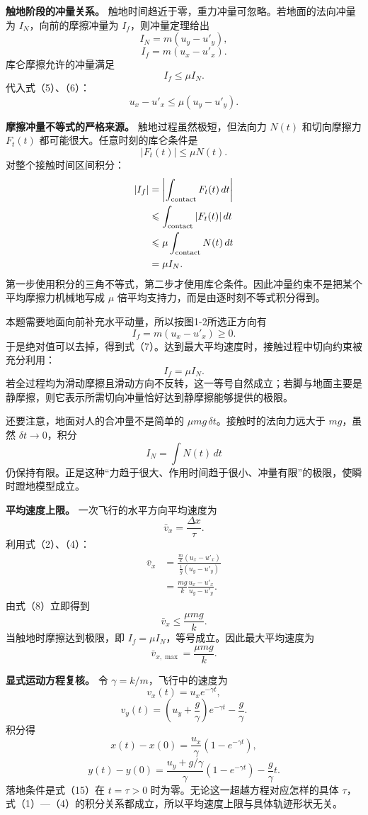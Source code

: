 \documentclass[12pt,a4paper,UTF8]{ctexart}
\begin{document}
\textbf{触地阶段的冲量关系。}
触地时间趋近于零，重力冲量可忽略。若地面的法向冲量为
\(I_N\)，向前的摩擦冲量为 \(I_f\)，则冲量定理给出 \[
I_N=m(u_y-u'_y), \tag{5}
\] \[
I_f=m(u_x-u'_x). \tag{6}
\] 库仑摩擦允许的冲量满足 \[
I_f\leq\mu I_N. \tag{7}
\] 代入式（5）、（6）： \[
u_x-u'_x\leq\mu(u_y-u'_y). \tag{8}
\]

\textbf{摩擦冲量不等式的严格来源。} 触地过程虽然极短，但法向力 \(N(t)\)
和切向摩擦力 \(F_t(t)\) 都可能很大。任意时刻的库仑条件是 \[
|F_t(t)|\leqslant\mu N(t).
\] 对整个接触时间区间积分： \[
\begin{aligned}
|I_f|
&=\left|
\int_{\rm contact}F_t(t)\,dt
\right|\\
&\leqslant
\int_{\rm contact}|F_t(t)|\,dt\\
&\leqslant
\mu\int_{\rm contact}N(t)\,dt\\
&=\mu I_N.
\end{aligned}
\]
第一步使用积分的三角不等式，第二步才使用库仑条件。因此冲量约束不是把某个平均摩擦力机械地写成
\(\mu\) 倍平均支持力，而是由逐时刻不等式积分得到。

本题需要地面向前补充水平动量，所以按图1-2所选正方向有 \[
I_f=m(u_x-u'_x)\geqslant0.
\]
于是绝对值可以去掉，得到式（7）。达到最大平均速度时，接触过程中切向约束被充分利用：
\[
I_f=\mu I_N.
\]
若全过程均为滑动摩擦且滑动方向不反转，这一等号自然成立；若脚与地面主要是静摩擦，则它表示所需切向冲量恰好达到静摩擦能够提供的极限。

还要注意，地面对人的合冲量不是简单的
\(\mu mg\,\delta t\)。接触时的法向力远大于 \(mg\)，虽然
\(\delta t\to0\)，积分 \[
I_N=\int N(t)\,dt
\]
仍保持有限。正是这种``力趋于很大、作用时间趋于很小、冲量有限''的极限，使瞬时蹬地模型成立。

\textbf{平均速度上限。} 一次飞行的水平方向平均速度为 \[
\bar v_x=\frac{\Delta x}{\tau}.
\] 利用式（2）、（4）： \[
\begin{aligned}
\bar v_x
&=\frac{\frac{m}{k}(u_x-u'_x)}
{\frac1g(u_y-u'_y)}\\
&=\frac{mg}{k}
\frac{u_x-u'_x}{u_y-u'_y}.
\end{aligned} \tag{9}
\] 由式（8）立即得到 \[
\boxed{\bar v_x\leq\frac{\mu mg}{k}}. \tag{10}
\] 当触地时摩擦达到极限，即
\(I_f=\mu I_N\)，等号成立。因此最大平均速度为 \[
\boxed{\bar v_{x,\max}=\frac{\mu mg}{k}}. \tag{11}
\]

\textbf{显式运动方程复核。} 令 \(\gamma=k/m\)，飞行中的速度为 \[
v_x(t)=u_xe^{-\gamma t}, \tag{12}
\] \[
v_y(t)=\left(u_y+\frac g\gamma\right)e^{-\gamma t}
-\frac g\gamma. \tag{13}
\] 积分得 \[
x(t)-x(0)=\frac{u_x}{\gamma}(1-e^{-\gamma t}), \tag{14}
\] \[
y(t)-y(0)
=\frac{u_y+g/\gamma}{\gamma}(1-e^{-\gamma t})
-\frac g\gamma t. \tag{15}
\] 落地条件是式（15）在 \(t=\tau>0\)
时为零。无论这一超越方程对应怎样的具体
\(\tau\)，式（1）---（4）的积分关系都成立，所以平均速度上限与具体轨迹形状无关。
\end{document}
